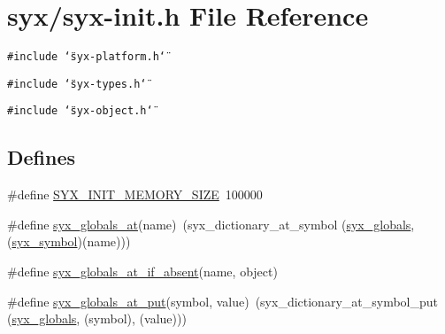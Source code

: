 \hypertarget{syx-init_8h}{
\section{syx/syx-init.h File Reference}
\label{syx-init_8h}
}
{\tt \#include \char`\"{}syx-platform.h\char`\"{}}\par
{\tt \#include \char`\"{}syx-types.h\char`\"{}}\par
{\tt \#include \char`\"{}syx-object.h\char`\"{}}\par
\subsection*{Defines}
\begin{CompactItemize}
\item 
\#define \hyperlink{syx-init_8h_27a70994157f8571e2c0dd4ee513ab3c}{SYX\_\-INIT\_\-MEMORY\_\-SIZE}~100000
\item 
\#define \hyperlink{syx-init_8h_2e08350ba0b87b6e6e85b21b23fde2c8}{syx\_\-globals\_\-at}(name)~(syx\_\-dictionary\_\-at\_\-symbol (\hyperlink{syx-object_8h_c285844af2007d5ac653de1a0dfb7524}{syx\_\-globals}, (\hyperlink{syx-types_8h_9663af54b7b72f5d8be5f754ef356525}{syx\_\-symbol})(name)))
\item 
\#define \hyperlink{syx-init_8h_10821da1be539c181bf05ea3089a62b5}{syx\_\-globals\_\-at\_\-if\_\-absent}(name, object)
\item 
\#define \hyperlink{syx-init_8h_f23cd621d758fbfffe13f58928e4b068}{syx\_\-globals\_\-at\_\-put}(symbol, value)~(syx\_\-dictionary\_\-at\_\-symbol\_\-put (\hyperlink{syx-object_8h_c285844af2007d5ac653de1a0dfb7524}{syx\_\-globals}, (symbol), (value)))
\end{CompactItemize}
